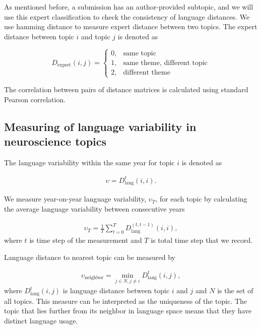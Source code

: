 \documentclass[10pt,letterpaper]{article}
\begin{document}
As mentioned before, a submission has an author-provided subtopic, and we will use this expert classification to check the consistency of language distances. We use hamming distance to measure expert distance between two topics. The expert distance between topic $i$ and topic $j$ is denoted as

\begin{equation}
    D_{\text{expert}} (i, j) =\left\{
                \begin{array}{ll}
                  0, & \text{same topic}\\
                  1, & \text{same theme, different topic}\\
                  2, & \text{different theme}
                \end{array}
              \right.
\end{equation}

The correlation between pairs of distance matrices is calculated using standard Pearson correlation.

\subsection*{Measuring of language variability in neuroscience topics}

The language variability within the same year for topic $i$ is denoted as

\begin{align}
    \upsilon = D_{\text{lang}}^{t} (i, i).
\end{align}

We measure year-on-year language variability, $\upsilon_T$, for each topic by calculating the average language variability between consecutive years

\begin{align}
    \upsilon_T = \frac{1}{T} \sum_{t = 0}^{T} D_{\text{lang}}^{(t, t-1)} (i, i),
\end{align}
where $t$ is time step of the measurement and $T$ is total time step that we record.

Language distance to nearest topic can be measured by

\begin{align}
    \upsilon_{\text{neighbor}} =  \min_{j \in N, j \neq i} D_{\text{lang}}^{t} (i, j),
\end{align}
where $D_{\text{lang}}^t (i, j)$ is language distance between topic $i$ and $j$ and $N$ is the set of all topics. This measure can be interpreted as the uniqueness of the topic. The topic that lies further from its neighbor in language space means that they have distinct language usage.
\end{document}
